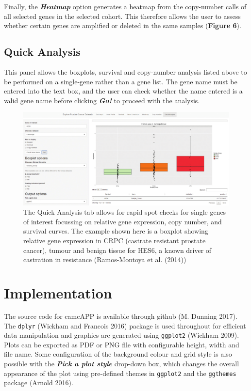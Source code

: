 \documentclass[]{article}
\begin{document}
Finally, the \textbf{\emph{Heatmap}} option generates a heatmap from the
copy-number calls of all selected genes in the selected cohort. This
therefore allows the user to assess whether certain genes are amplified
or deleted in the same samples (\textbf{Figure 6}).

\subsection{Quick Analysis}\label{quick-analysis}

This panel allows the boxplots, survival and copy-number analysis listed
above to be performed on a single-gene rather than a gene list. The gene
name must be entered into the text box, and the user can check whether
the name entered is a valid gene name before clicking
\textbf{\emph{Go!}} to proceed with the analysis.

\begin{figure}[htbp]
\centering
\includegraphics{Figure7.png}
\caption{The Quick Analysis tab allows for rapid spot checks for single
genes of interest focussing on relative gene expression, copy number,
and survival curves. The example shown here is a boxplot showing
relative gene expression in CRPC (castrate resistant prostate cancer),
tumour and benign tissue for HES6, a known driver of castration in
resistance (Ramos-Montoya et al. (2014))}
\end{figure}

\newpage

\section{Implementation}\label{implementation}

The source code for camcAPP is available through github (M. Dunning
2017). The \texttt{dplyr} (Wickham and Francois 2016) package is used
throughout for efficient data manipulation and graphics are generated
using \texttt{ggplot2} (Wickham 2009). Plots can be exported as PDF or
PNG file with configurable height, width and file name. Some
configuration of the background colour and grid style is also possible
with the \textbf{\emph{Pick a plot style}} drop-down box, which changes
the overall appearance of the plot using pre-defined themes in
\texttt{ggplot2} and the \texttt{ggthemes} package (Arnold 2016).
\end{document}
